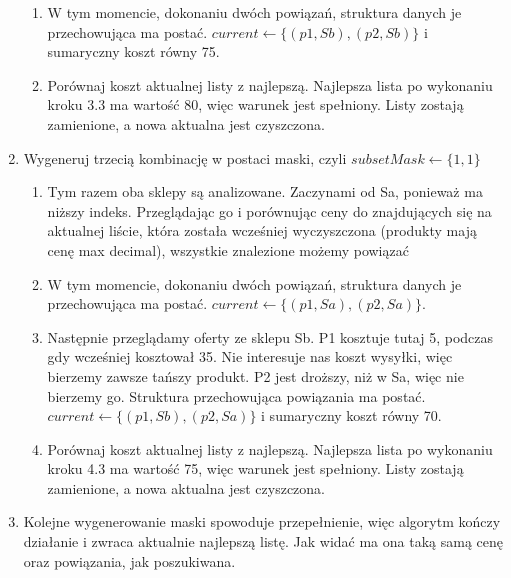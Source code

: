 \documentclass[a4paper]{article}
\begin{document}
\begin{enumerate}
{\begin{enumerate}
\item{W tym momencie, dokonaniu dwóch powiązań, struktura danych je przechowująca ma postać.
$current \leftarrow \{(p1, Sb), (p2, Sb)\}$ i sumaryczny koszt równy 75.}
\item {Porównaj koszt aktualnej listy z najlepszą. Najlepsza lista po wykonaniu kroku 3.3 ma wartość 80, więc warunek jest spełniony. Listy zostają zamienione, a nowa aktualna jest czyszczona.}
\end{enumerate}}
\item {Wygeneruj trzecią kombinację w postaci maski, czyli $subsetMask \leftarrow \{1, 1\}$
\begin{enumerate}
\item {Tym razem oba sklepy są analizowane. Zaczynami od Sa, ponieważ ma niższy indeks. Przeglądając go i porównując ceny do znajdujących się na aktualnej liście, która została wcześniej wyczyszczona (produkty mają cenę max decimal), wszystkie znalezione możemy powiązać}
\item{W tym momencie, dokonaniu dwóch powiązań, struktura danych je przechowująca ma postać.
$current \leftarrow \{(p1, Sa), (p2, Sa)\}$.}
\item{Następnie przeglądamy oferty ze sklepu Sb. P1 kosztuje tutaj 5, podczas gdy wcześniej kosztował 35. Nie interesuje nas koszt wysyłki, więc bierzemy zawsze tańszy produkt. P2 jest droższy, niż w Sa, więc nie bierzemy go. Struktura przechowująca powiązania ma postać.
$current \leftarrow \{(p1, Sb), (p2, Sa)\}$ i sumaryczny koszt równy 70.}
\item {Porównaj koszt aktualnej listy z najlepszą. Najlepsza lista po wykonaniu kroku 4.3 ma wartość 75, więc warunek jest spełniony. Listy zostają zamienione, a nowa aktualna jest czyszczona.}
\end{enumerate}}
\item{ Kolejne wygenerowanie maski spowoduje przepełnienie, więc algorytm kończy działanie i zwraca aktualnie najlepszą listę. Jak widać ma ona taką samą cenę oraz powiązania, jak poszukiwana.}
\end{enumerate}
\end{document}
